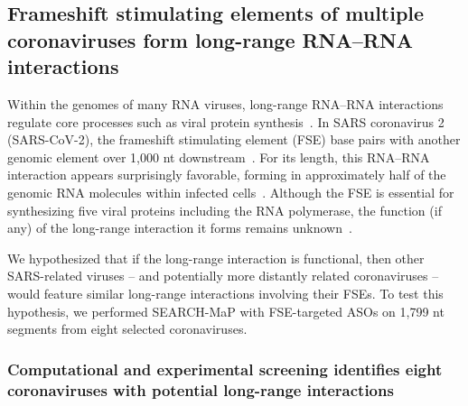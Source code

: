 \documentclass[main.tex]{subfiles}
\begin{document}
\subsection{Frameshift stimulating elements of multiple coronaviruses form long-range RNA--RNA interactions}

Within the genomes of many RNA viruses, long-range RNA--RNA interactions regulate core processes such as viral protein synthesis~\cite{Nicholson2014}.
In SARS coronavirus 2 (SARS-CoV-2), the frameshift stimulating element (FSE) base pairs with another genomic element over 1,000 nt downstream~\cite{Ziv2020}.
For its length, this RNA--RNA interaction appears surprisingly favorable, forming in approximately half of the genomic RNA molecules within infected cells~\cite{Lan2022}.
Although the FSE is essential for synthesizing five viral proteins including the RNA polymerase, the function (if any) of the long-range interaction it forms remains unknown~\cite{Allan2023}.

We hypothesized that if the long-range interaction is functional, then other SARS-related viruses -- and potentially more distantly related coronaviruses -- would feature similar long-range interactions involving their FSEs.
To test this hypothesis, we performed SEARCH-MaP with FSE-targeted ASOs on 1,799 nt segments from eight selected coronaviruses.


\subsubsection{Computational and experimental screening identifies eight coronaviruses with potential long-range interactions}
\end{document}
